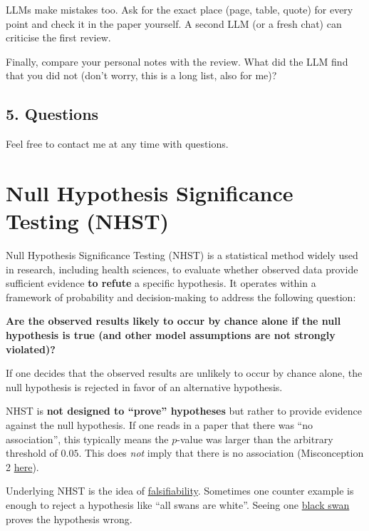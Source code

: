 \documentclass[
]{book}
\begin{document}
LLMs make mistakes too. Ask for the exact place (page, table, quote) for every point and check it in the paper yourself.
A second LLM (or a fresh chat) can criticise the first review.

Finally, compare your personal notes with the review. What did the LLM find that you did not
(don't worry, this is a long list, also for me)?

\section*{5. Questions}\label{questions-1}

Feel free to contact me at any time with questions.

\chapter{Null Hypothesis Significance Testing (NHST)}\label{nhst}

Null Hypothesis Significance Testing (NHST) is a statistical method widely used in research,
including health sciences, to evaluate whether observed data provide sufficient evidence \textbf{to refute} a specific hypothesis.
It operates within a framework of probability and decision-making to address the following question:

\textbf{Are the observed results likely to occur by chance alone if the null hypothesis is true (and other model assumptions are not strongly violated)?}

If one decides that the observed results are unlikely to occur by chance alone,
the null hypothesis is rejected in favor of an alternative hypothesis.

NHST is \textbf{not designed to ``prove'' hypotheses} but rather to provide evidence against the null hypothesis.
If one reads in a paper that there was ``no association'', this typically means the
\(p\)-value was larger than the arbitrary threshold of \(0.05\). This does \emph{not} imply that
there is no association (Misconception 2 \href{https://sixsigmadsi.com/wp-content/uploads/2020/10/A-Dirty-Dozen-Twelve-P-Value-Misconceptions.pdf}{here}).

Underlying NHST is the idea of \href{https://en.wikipedia.org/wiki/Falsifiability}{falsifiability}.
Sometimes one counter example is enough to reject a hypothesis like ``all swans are white''.
Seeing one \href{https://en.wikipedia.org/wiki/Falsifiability\#/media/File:Black_Swans.jpg}{black swan}
proves the hypothesis wrong.
\end{document}
